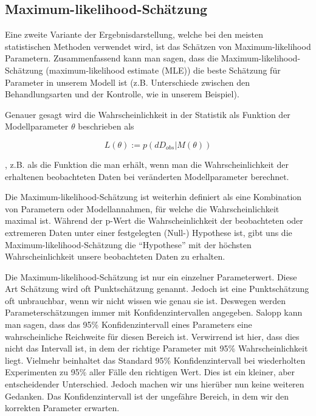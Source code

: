 \documentclass[a4paper,twoside]{tufte-book}\usepackage[]{graphicx}\usepackage[]{color}
\begin{document}
\subsection{Maximum-likelihood-Schätzung}

Eine zweite Variante der Ergebnisdarstellung, welche bei den meisten statistischen Methoden verwendet wird, ist das Schätzen von Maximum-likelihood Parametern. Zusammenfassend kann man sagen, dass die Maximum-likelihood-Schätzung (maximum-likelihood estimate (MLE)) die beste Schätzung für Parameter in unserem Modell ist (z.B. Unterschiede zwischen den Behandlungsarten und der Kontrolle, wie in unserem Beispiel).


Genauer gesagt wird die Wahrscheinlichkeit in der Statistik als Funktion der Modellparameter $\theta$ beschrieben als

\begin{equation}
L(\theta) := p(dD_{obs} | M(\theta))
\end{equation}

, z.B. als die Funktion die man erhält, wenn man die Wahrscheinlichkeit der erhaltenen beobachteten Daten bei veränderten Modellparameter berechnet.

Die Maximum-likelihood-Schätzung ist weiterhin definiert als eine Kombination von Parametern oder Modellannahmen, für welche die Wahrscheinlichkeit maximal ist. Während der p-Wert die Wahrscheinlichkeit der beobachteten 
oder extremeren Daten unter einer festgelegten (Null-) Hypothese ist, gibt uns die Maximum-likelihood-Schätzung die "`Hypothese"' mit der höchsten Wahrscheinlichkeit unsere beobachteten Daten zu erhalten.

Die Maximum-likelihood-Schätzung ist nur ein einzelner Parameterwert. Diese Art Schätzung wird oft Punktschätzung genannt. Jedoch ist eine Punktschätzung oft unbrauchbar, wenn wir nicht wissen wie genau sie ist. Deswegen werden Parameterschätzungen immer mit Konfidenzintervallen angegeben. Salopp kann man sagen, dass das 95\% Konfidenzintervall eines Parameters eine wahrscheinliche Reichweite für diesen Bereich ist. Verwirrend ist hier, dass dies nicht das Intervall ist, in dem der richtige Parameter mit 95\% Wahrscheinlichkeit liegt. Vielmehr beinhaltet das Standard 95\% Konfidenzintervall bei wiederholten Experimenten zu 95\% aller Fälle den richtigen Wert. Dies ist ein kleiner, aber entscheidender Unterschied. Jedoch machen wir uns hierüber nun keine weiteren Gedanken. Das Konfidenzintervall ist der ungefähre Bereich, in dem wir den korrekten Parameter erwarten. 
\end{document}
